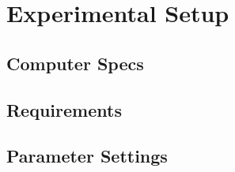 
\section{Experimental Setup}

\subsection{Computer Specs}


\subsection{Requirements}


\subsection{Parameter Settings}


